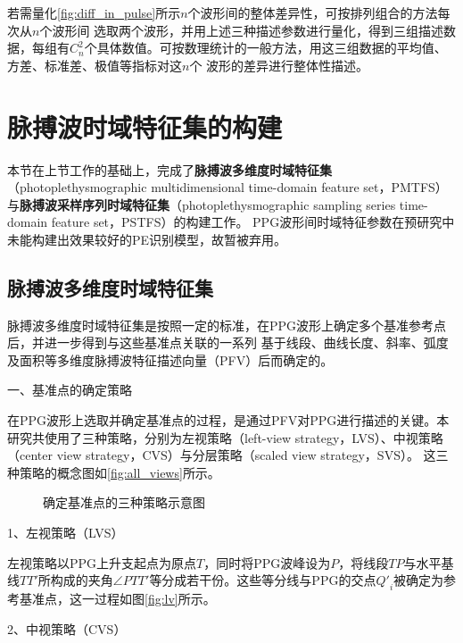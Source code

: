 若需量化\autoref{fig:diff_in_pulse}所示$n$个波形间的整体差异性，可按排列组合的方法每次从$n$个波形间
选取两个波形，并用上述三种描述参数进行量化，得到三组描述数据，每组有$C_n^2$个具体数值。可按数理统计的一般方法，用这三组数据的平均值、方差、标准差、极值等指标对这$n$个
波形的差异进行整体性描述。

\section{脉搏波时域特征集的构建}
本节在上节工作的基础上，完成了\textbf{脉搏波多维度时域特征集}（photoplethysmographic multidimensional time-domain feature set，PMTFS）
与\textbf{脉搏波采样序列时域特征集}（photoplethysmographic sampling series time-domain feature set，PSTFS）的构建工作。
PPG波形间时域特征参数在预研究中未能构建出效果较好的PE识别模型，故暂被弃用。

\subsection{脉搏波多维度时域特征集}

脉搏波多维度时域特征集是按照一定的标准，在PPG波形上确定多个基准参考点后，并进一步得到与这些基准点关联的一系列
基于线段、曲线长度、斜率、弧度及面积等多维度脉搏波特征描述向量（PFV）后而确定的。

一、基准点的确定策略

在PPG波形上选取并确定基准点的过程，是通过PFV对PPG进行描述的关键。本研究共使用了三种策略，分别为左视策略（left-view strategy，LVS）、中视策略（center view strategy，CVS）与分层策略（scaled view strategy，SVS）。
这三种策略的概念图如\autoref{fig:all_views}所示。
\begin{figure}[htbp]
    \centering
    \quad
    \quad
    \caption{\label{fig:all_views}确定基准点的三种策略示意图}
\end{figure}

1、左视策略（LVS）

左视策略以PPG上升支起点为原点$T$，同时将PPG波峰设为$P$，将线段$TP$与水平基线$TT'$所构成的夹角$\angle PTT'$等分成若干份。这些等分线与PPG的交点${Q'}_i$被确定为参考基准点，这一过程如图\autoref{fig:lv}所示。

2、中视策略（CVS）

